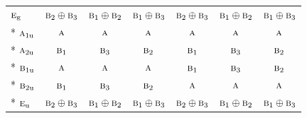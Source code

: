 \documentclass[10pt,a4paper]{article}
\numberwithin{equation}{section}
\newcommand{\irr}[1]{\text{\normalfont\scshape #1}}
\newcommand{\ptag}[1]{\mathrm{#1}}
\begin{document}
{\begin{longtable}{@{}lcccccc@{}}
$\irr{e}_{\ptag{g}}$ & $\irr{b}_{2}\oplus \irr{b}_{3}$ & $\irr{b}_{1}\oplus \irr{b}_{2}$ & $\irr{b}_{1}\oplus \irr{b}_{3}$ & $\irr{b}_{2}\oplus \irr{b}_{3}$ & $\irr{b}_{1}\oplus \irr{b}_{2}$ & $\irr{b}_{1}\oplus \irr{b}_{3}$\\*
$\irr{a}_{1\ptag{u}}$ & $\irr{a}$ & $\irr{a}$ & $\irr{a}$ & $\irr{a}$ & $\irr{a}$ & $\irr{a}$\\*
$\irr{a}_{2\ptag{u}}$ & $\irr{b}_{1}$ & $\irr{b}_{3}$ & $\irr{b}_{2}$ & $\irr{b}_{1}$ & $\irr{b}_{3}$ & $\irr{b}_{2}$\\*
$\irr{b}_{1\ptag{u}}$ & $\irr{a}$ & $\irr{a}$ & $\irr{a}$ & $\irr{b}_{1}$ & $\irr{b}_{3}$ & $\irr{b}_{2}$\\*
$\irr{b}_{2\ptag{u}}$ & $\irr{b}_{1}$ & $\irr{b}_{3}$ & $\irr{b}_{2}$ & $\irr{a}$ & $\irr{a}$ & $\irr{a}$\\*
$\irr{e}_{\ptag{u}}$ & $\irr{b}_{2}\oplus \irr{b}_{3}$ & $\irr{b}_{1}\oplus \irr{b}_{2}$ & $\irr{b}_{1}\oplus \irr{b}_{3}$ & $\irr{b}_{2}\oplus \irr{b}_{3}$ & $\irr{b}_{1}\oplus \irr{b}_{2}$ & $\irr{b}_{1}\oplus \irr{b}_{3}$\\
\bottomrule\end{longtable}}
\end{document}

